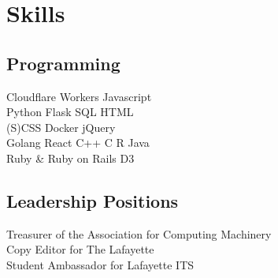 \documentclass[]{deedy-resume-openfont}
\begin{document}
\section{Skills}
\begin{minipage}[t]{.4\textwidth}
\subsection{Programming}
Cloudflare Workers \textbullet{} Javascript \\ Python \textbullet{} Flask \textbullet{} SQL \textbullet{} HTML \\ (S)CSS \textbullet{} Docker \textbullet{} jQuery \\
Golang \textbullet{} React \textbullet{} C++ \textbullet{} C \textbullet{} R \textbullet{} Java \\ Ruby \& Ruby on Rails \textbullet{} D3 \\
\sectionsep
\end{minipage}
\hfill
\begin{minipage}[t]{.5\textwidth}
\subsection{Leadership Positions}
\textbullet{} Treasurer of the Association for Computing Machinery \\
\textbullet{} Copy Editor for The Lafayette \\
\textbullet{} Student Ambassador for Lafayette ITS
\end{minipage}
\end{document}
